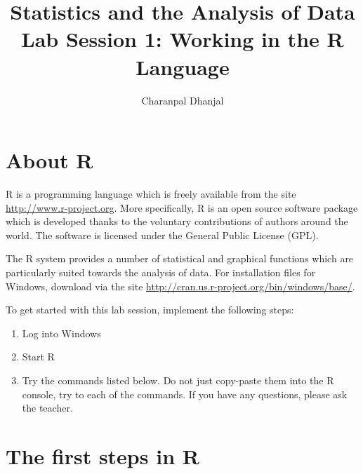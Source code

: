 \documentclass[a4paper,10pt]{article}
\title{Statistics and the Analysis of Data\\ Lab Session 1: Working in the R Language}
\author{Charanpal Dhanjal}
\begin{document}
\maketitle


\section{About R}

R is a programming language which is freely available from the site \url{http://www.r-project.org}. More specifically, R is an open source software package which is developed thanks to the voluntary contributions of authors around the world. The software is licensed under the General Public License (GPL). 

The R system provides a number of statistical and graphical functions which are particularly suited towards the analysis of data. For installation files for Windows, download via the site \url{http://cran.us.r-project.org/bin/windows/base/}. 

To get started with this lab session, implement the following steps: 
\begin{enumerate}
 \item Log into Windows 
 \item Start R 
 \item Try the commands listed below. Do not just copy-paste them into the R console, try to each of the commands. If you have any questions, please ask the teacher. 
\end{enumerate}

\section{The first steps in R} 
\end{document}
